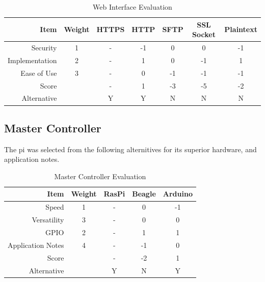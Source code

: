 \begin{table}[h]
\caption{Web Interface Evaluation}
	\label{table:TCPIP}
	\centering
\begin{tabular}{|r|c|c|c|c|c|c|}
\hline
Item              	& Weight & HTTPS  & HTTP       & SFTP        & SSL Socket	& Plaintext\\ \hline
Security       	& 1      & -      & -1         & 0           & 0          	& -1   \\ \hline
Implementation	& 2      & -      & 1          & 0           & -1     		& 1   \\ \hline
Ease of Use       	& 3      & -      & 0          & -1          & -1         	& -1 \\ \hline
Score         	&        & -      & 1          & -3          & -5         	& -2   \\ \hline
Alternative     	&        & Y      & Y          & N           & N       	& N   \\ \hline
\end{tabular}
\end{table}

\subsection{Master Controller}
The \gls{pi} was selected from the following alternitives for its superior hardware, and application notes.
\begin{table}[H]
\caption{Master Controller Evaluation}
	\label{table:MaCEval}
	\centering
\begin{tabular}{|r|c|c|c|c|}
\hline
Item              & Weight & RasPi & Beagle &Arduino \\ \hline
Speed             & 1      & -     & 0                                                     & -1                                                     \\ \hline
Versatility       & 3      & -     & 0                                                     & 0                                                      \\ \hline
GPIO              & 2      & -     & 1                                                     & 1                                                      \\ \hline
Application Notes & 4      & -     & -1                                                    & 0                                                      \\ \hline
Score             &        & -     & -2                                                    & 1                                                      \\ \hline
Alternative       &        & Y     & N                                                    & Y                                                    \\ \hline
\end{tabular}
\end{table}

